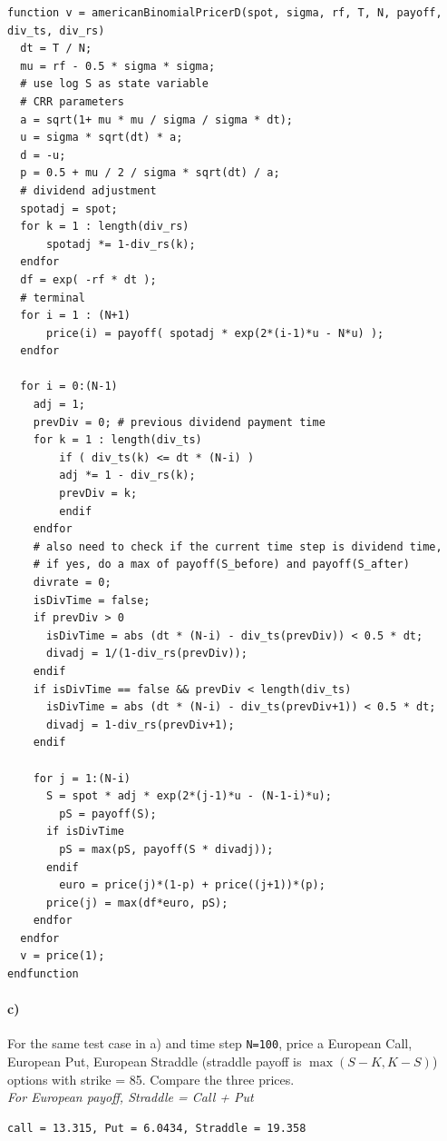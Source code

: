 \documentclass[12pt,a4paper,hidelinks,fleqn]{article}            %
\begin{document}
\begin{small}

\begin{verbatim}
function v = americanBinomialPricerD(spot, sigma, rf, T, N, payoff, div_ts, div_rs)
  dt = T / N;
  mu = rf - 0.5 * sigma * sigma;
  # use log S as state variable
  # CRR parameters
  a = sqrt(1+ mu * mu / sigma / sigma * dt);
  u = sigma * sqrt(dt) * a;
  d = -u;
  p = 0.5 + mu / 2 / sigma * sqrt(dt) / a;
  # dividend adjustment
  spotadj = spot;
  for k = 1 : length(div_rs)
      spotadj *= 1-div_rs(k);
  endfor
  df = exp( -rf * dt );
  # terminal
  for i = 1 : (N+1)
      price(i) = payoff( spotadj * exp(2*(i-1)*u - N*u) );
  endfor

  for i = 0:(N-1)
    adj = 1;
    prevDiv = 0; # previous dividend payment time
    for k = 1 : length(div_ts)
    	if ( div_ts(k) <= dt * (N-i) )
        adj *= 1 - div_rs(k);
        prevDiv = k;
	    endif
    endfor
    # also need to check if the current time step is dividend time, 
    # if yes, do a max of payoff(S_before) and payoff(S_after)
    divrate = 0;
    isDivTime = false;
    if prevDiv > 0
      isDivTime = abs (dt * (N-i) - div_ts(prevDiv)) < 0.5 * dt;
      divadj = 1/(1-div_rs(prevDiv));
    endif
    if isDivTime == false && prevDiv < length(div_ts)
      isDivTime = abs (dt * (N-i) - div_ts(prevDiv+1)) < 0.5 * dt;
      divadj = 1-div_rs(prevDiv+1);
    endif
    
    for j = 1:(N-i)
      S = spot * adj * exp(2*(j-1)*u - (N-1-i)*u);
	    pS = payoff(S);
      if isDivTime
        pS = max(pS, payoff(S * divadj));
      endif
	    euro = price(j)*(1-p) + price((j+1))*(p);
      price(j) = max(df*euro, pS);
    endfor
  endfor
  v = price(1);
endfunction
\end{verbatim}
\end{small}

\vspace{-1cm}
\paragraph{c)} For the same test case in a) and time step \verb-N=100-, 
price a European Call, European Put, European Straddle (straddle payoff is $\max(S-K, K-S)$) options with strike = 85. 
Compare the three prices. \\
\emph{For European payoff, Straddle = Call + Put}
\begin{verbatim}
call = 13.315, Put = 6.0434, Straddle = 19.358
\end{verbatim}
\end{document}
